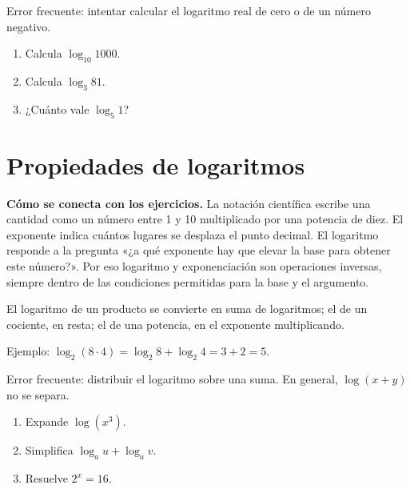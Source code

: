 \documentclass[10pt,oneside,openany]{book}
\begin{document}
\begin{ojo}
Error frecuente: intentar calcular el logaritmo real de cero o de un número negativo.
\end{ojo}

\begin{practica}

\begin{enumerate}

\item Calcula $\log_{10}1000$.

\item Calcula $\log_3 81$.

\item ¿Cuánto vale $\log_5 1$?

\end{enumerate}

\end{practica}



\section{Propiedades de logaritmos}

\textbf{Cómo se conecta con los ejercicios.} La notación científica escribe una cantidad como un número entre 1 y 10 multiplicado por una potencia de diez. El exponente indica cuántos lugares se desplaza el punto decimal. El logaritmo responde a la pregunta «¿a qué exponente hay que elevar la base para obtener este número?». Por eso logaritmo y exponenciación son operaciones inversas, siempre dentro de las condiciones permitidas para la base y el argumento.

El logaritmo de un producto se convierte en suma de logaritmos; el de un cociente, en resta; el de una potencia, en el exponente multiplicando.

\begin{ejemplo}
Ejemplo: $\log_2(8\cdot4)=\log_2 8+\log_2 4=3+2=5$.
\end{ejemplo}

\begin{ojo}
Error frecuente: distribuir el logaritmo sobre una suma. En general, $\log(x+y)$ no se separa.
\end{ojo}

\begin{practica}

\begin{enumerate}

\item Expande $\log(x^3)$.

\item Simplifica $\log_a u+\log_a v$.

\item Resuelve $2^x=16$.

\end{enumerate}

\end{practica}
\end{document}
